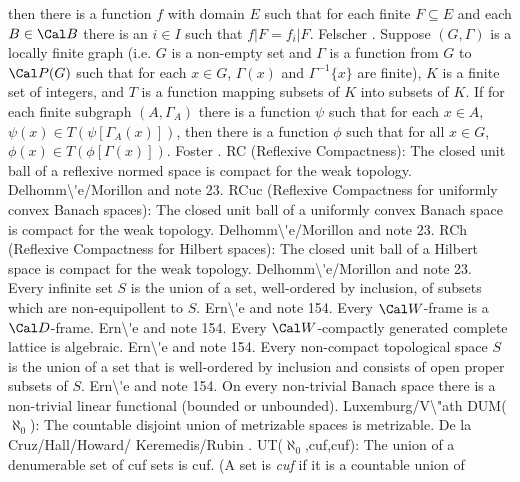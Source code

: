 \noindent
then there is a function $f$ with domain $E$ such that for each
finite $F\subseteq E$ and each $B\in\Cal B$ there is an $i\in I$
such that $f|F = f_i|F$. \ac{Felscher} \cite{1964}.
\medskip
{} Suppose $(G,\Gamma)$ is a locally finite
graph (i.e. $G$ is a non-empty set and $\Gamma$ is a function from
$G$ to $\Cal P(G)$ such that for each $x\in G$, $\Gamma(x)$ and
$\Gamma^{-1}\{x\}$ are finite), $K$ is a finite set of integers, and
$T$ is a function mapping subsets of $K$ into subsets of $K$.
If for each finite subgraph $(A,\Gamma_A)$ there is a function $\psi$
such that for each $x\in A$, $\psi(x)\in T(\psi[\Gamma_A(x)])$, then
there is a function $\phi$ such that for all $x\in G$, $\phi(x)\in
T(\phi[\Gamma(x)])$. \ac{Foster} \cite{1964}.
\medskip
{} RC (Reflexive Compactness): The closed
unit ball of a reflexive normed space is compact for the weak
topology. \ac{Delhomm\'e/Morillon} \cite{2000} and note 23.
\medskip
{} RCuc (Reflexive Compactness for uniformly
convex Banach spaces): The closed unit ball of a uniformly convex
Banach space is compact for the weak topology. \ac{Delhomm\'e/Morillon}
\cite{2000} and note 23.
\medskip
{} RCh (Reflexive Compactness for Hilbert
spaces): The closed unit ball of a Hilbert space is compact for the weak
topology. \ac{Delhomm\'e/Morillon} \cite{2000} and note 23.
\medskip
{} Every infinite set $S$ is the union of a
set, well-ordered by inclusion, of subsets which are
non-equipollent to $S$.  \ac{Ern\'e} \cite{2000} and note 154.
\medskip
{}  Every $\Cal W$-frame is a $\Cal
D$-frame.  \ac{Ern\'e} \cite{2000} and note 154.
\medskip
{}  Every $\Cal W$-compactly generated
complete lattice is algebraic.  \ac{Ern\'e} \cite{2000} and note 154.
\medskip
{} Every non-compact topological space $S$ is
the union of a set that is well-ordered by inclusion and consists
of open proper subsets of $S$.  \ac{Ern\'e} \cite{2000} and note 154.
\medskip
{}  On every non-trivial Banach space there is a
non-trivial linear functional (bounded or unbounded).  \ac{Luxemburg/V\"ath}
\cite{2001}  
\medskip
{}  DUM($\aleph_0$): The countable disjoint union
of metrizable spaces is metrizable. \ac{De la Cruz/Hall/Howard/
Keremedis/Rubin} \cite{2002a}.
\medskip
{} UT($\aleph_0$,cuf,cuf): The union of a denumerable
set of cuf sets is cuf. (A set is {\it cuf} if it is a countable union of

